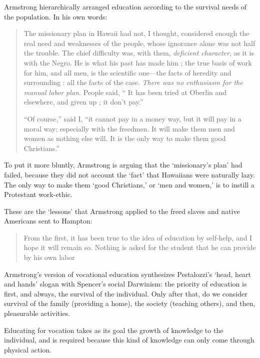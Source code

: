 Armstrong hierarchically arranged education according to the survival needs of the population. In his own words:

\begin{quote}

The missionary plan in Hawaii had not, I thought, considered
enough the real need and weaknesses of the people, whose ignorance alone was not half the trouble. The chief difficulty was, with them, \emph{deficient character}, as it is with the Negro. He is what his past has made him ; the true basis of work for him, and all men, is the scientific one---the facts of heredity and surrounding : all the facts of the case. \emph{There was no enthusiasm for the manual labor plan.} People said, `` It has been tried at Oberlin and elsewhere, and
given up ; it don't pay.''

``Of course,'' said I, ``it cannot pay in a money way, but it
will pay in a moral way; especially with the freedmen. It
will make them men and women as nothing else will. It is
the only way to make them good Christians.''~\citep[p. 6]{Armstrong:1891wr}
\end{quote}

To put it more bluntly, Armstrong is arguing that the `missionary's plan' had failed, because they did not account the `fact' that Hawaiians were naturally lazy. The only way to make them `good Christians,' or `men and women,' is to instill a Protestant work-ethic.

These are the `lessons' that Armstrong applied to the freed slaves and native Americans sent to Hampton:

\begin{quote}

From the first, it has been true to the idea of education
by self-help, and I hope it will remain so. Nothing is asked
for the student that he can provide by his own labor ~\citep[p. 7]{Armstrong:1891wr}
\end{quote}

Armstrong's version of vocational education synthesizes Pestalozzi's `head, heart and hands' slogan with Spencer's social Darwinism: the priority of education is first, and always, the survival of the individual. Only after that, do we consider survival of the family (providing a home), the society (teaching others), and then, pleasurable activities.\begin{purpose}\label{def:forvocation-armstrong}
Educating for vocation takes as its goal the growth of knowledge to the individual, and is required because this kind of knowledge can only come through physical action.
\end{purpose} 


